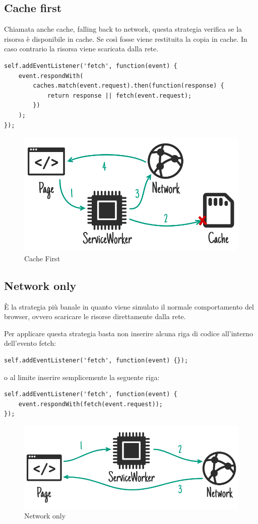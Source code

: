 \documentclass[11pt ,a4paper , twoside , openright ]{article}
\begin{document}
\subsection{Cache first}
Chiamata anche cache, falling back to network, questa strategia verifica se la risorsa è disponibile in cache. Se così fosse viene restituita la copia in cache. In caso contrario la risorsa viene scaricata dalla rete.
\begin{lstlisting}
self.addEventListener('fetch', function(event) {
	event.respondWith(
		caches.match(event.request).then(function(response) {
			return response || fetch(event.request);
		})
	);
});
\end{lstlisting}
\begin{figure}[h]
	\centering
	\includegraphics[width=1\linewidth]{Strategia2}
	\caption{Cache First}
	\label{fig: Cache First}
\end{figure}
\pagebreak
\subsection{Network only}
È la strategia più banale in quanto viene simulato il normale comportamento del browser, ovvero scaricare le risorse direttamente dalla rete.

Per applicare  questa strategia basta non inserire alcuna riga di codice all’interno dell’evento fetch:
\begin{lstlisting}
self.addEventListener('fetch', function(event) {});
\end{lstlisting}
o al limite inserire semplicemente la seguente riga:
\begin{lstlisting}
self.addEventListener('fetch', function(event) {
	event.respondWith(fetch(event.request));
});
\end{lstlisting}
\begin{figure}[h]
	\centering
	\includegraphics[width=1\linewidth]{Strategia3}
	\caption{Network only}
	\label{fig: Network only}
\end{figure}
\pagebreak
\end{document}
